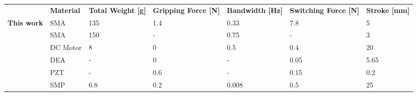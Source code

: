 \documentclass[border=1mm,
               class=article
               preview]{standalone}
\begin{document}
{
\begin{tabular}{@{}p{}
                P{0.12\tabcolsep}
                P{0.14\tabcolsep}
                P{0.14\tabcolsep}
                P{0.14\tabcolsep}
                P{0.14\tabcolsep}
                P{0.11\tabcolsep}@{}}
                               & \textbf{\color{white} Material} & \textbf{\color{white} Total Weight {[}g{]}} & \textbf{\color{white} Gripping Force {[}N{]}} & \textbf{\color{white} Bandwidth {[}Hz{]}} & \textbf{\color{white} Switching Force {[}N{]}} & \textbf{\color{white} Stroke {[}mm{]}} \\
\textbf{This work}              & SMA                          & 135                             & 1.4                             & 0.33                        & 7.8                              & 5\\
\cite{scholtesDevelopmentBistableSMA2021} & SMA                          & 150                           & -                              & 0.75                        & -                                & 3                        \\
\cite{zhangCompliantBistableGrippers2020}   & DC Motor                     & 8                             & 0                               & 0.5                         & 0.4                              & 20                       \\
\cite{wangDesignAnalysisBistable2018a}    & DEA                          & -                             & 0                               & -                           & 0.05                             & 5.65                     \\
\cite{liuDesignControlNovel2017}     & PZT                          & -                             & 0.6                             & -                           & 0.15                             & 0.2                      \\
\cite{lernerDesignExperimentationVariable2020}   & SMP                          & 6.8                           & 0.2                             & 0.008                       & 0.5                              & 25
\end{tabular}}
\end{document}
